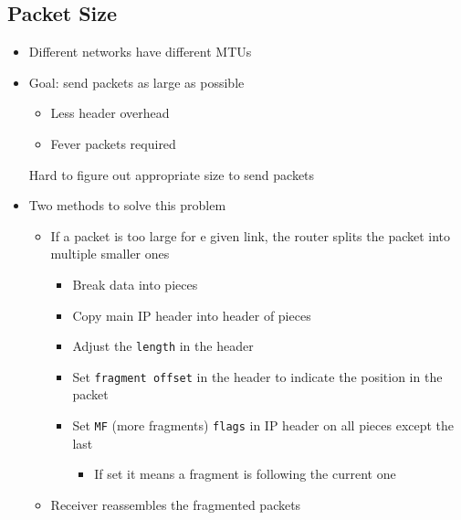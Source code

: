 \subsection{Packet Size}
\begin{itemize}
        \begin{itemize}
            \item Maximal allowed packet size
        \end{itemize}
    \item Different networks have different MTUs
    \item Goal: send packets as large as possible
        \begin{itemize}
            \item Less header overhead
            \item Fever packets required
        \end{itemize}
    \icon Hard to figure out appropriate size to send packets
    \item Two methods to solve this problem
        \begin{itemize}
                \begin{itemize}
                    \item If a packet is too large for e given link, the router splits the packet into multiple smaller ones
                        \begin{itemize}
                            \item Break data into pieces
                            \item Copy main IP header into header of pieces
                            \item Adjust the \verb+length+ in the header
                            \item Set \verb+fragment offset+ in the header to indicate the position in the packet
                            \item Set \verb+MF+ (more fragments) \verb+flags+ in IP header on all pieces except the last
                                \begin{itemize}
                                    \item If set it means a fragment is following the current one
                                \end{itemize}
                        \end{itemize}
                    \item Receiver reassembles the fragmented packets

\end{itemize}
\end{itemize}
\end{itemize}
